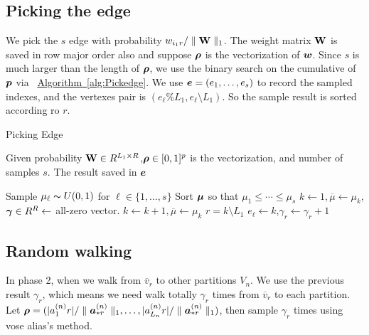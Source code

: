 \documentclass{article}
\newcommand{\V}[1]{{\bm{{\MakeLowercase{#1}}}}}%
\newcommand{\Vacol}[1]{\V{a}^{(#1)}_{*r}}
\newcommand{\M}[1]{{\bm{\mathbf{\MakeUppercase{#1}}}}}%
\newcommand{\norm}[2]{\parallel#1\parallel_{#2}}
\newcommand{\Alg}[1]{\hyperref[alg:#1]{Algorithm~\ref*{alg:#1}}}
\begin{document}
\subsection{Picking the edge}
We pick the $s$ edge with probability  $w_{i_1r}/\norm{\M{W}}{1}$. The weight matrix $\M{W}$ is saved in row major order also and suppose $\V{\rho}$ is the vectorization of $\V{W}$. Since $s$ is much larger than the length of $\V{\rho}$, we use the binary search on the cumulative of $\V{p}$ via ~\Alg{Pickedge}. We use $\V{e}=(e_1,\ldots,e_s)$ to record the sampled indexes, and the vertexes pair is $(e_{\ell}\%L_1,e_{\ell}\setminus L_1)$. So the sample result is sorted according ro $r$.


\begin{algorithm}[t]
    \caption{Picking Edge}
    \label{alg:Pickedge}
    Given probability $\M{W}\in R^{L_1\times R}$,$\V{\rho}\in[0,1]^p$ is the vectorization, and number of samples $s$.
    The result saved in $\V{e}$
    \begin{algorithmic}[1]
    \State Sample $\mu_{\ell} \thicksim U(0,1)$ for $\ell \in \{1,\ldots,s\}$
    \State Sort $\V{\mu}$ so that $\mu_1 \leq \cdots\leq\mu_s$
    \State $k \leftarrow 1,\overline{\mu} \leftarrow \mu_k$,$\V{\gamma}\in R^R\leftarrow$ all-zero vector.
    \While {$\mu_{\ell} > \overline{\mu}$}
    \State $k \leftarrow k+1,\overline{\mu} \leftarrow \mu_k$
    \EndWhile
    \State $r = k \setminus L_1$
    \State $e_{\ell}\leftarrow k$,$\gamma_{r}\leftarrow \gamma_{r} + 1$
    \EndFor
    \end{algorithmic}
\end{algorithm}
\subsection{Random walking}

In phase 2, when we walk from $\overline{v}_r$ to other partitions $V_n$. We use the previous result $\gamma_{r}$, which means we need walk totally $\gamma_{r}$ times from $\overline{v}_r$ to each  partition. Let $\V{\rho} = (|{a}^{(n)}_{1}{r}|/\norm{\Vacol{n}}{1},\ldots,|{a}^{(n)}_{L_n}{r}|/\norm{\Vacol{n}}{1})$, then sample $\gamma_{r}$ times using vose alias's method.
\end{document}
